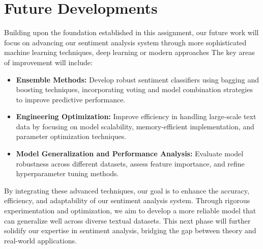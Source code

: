 \section{Future Developments}

Building upon the foundation established in this assignment, our future work will focus on advancing our sentiment analysis system through more sophisticated machine learning techniques, deep learning or modern approaches The key areas of improvement will include:

\begin{itemize}
    \item \textbf{Ensemble Methods:} Develop robust sentiment classifiers using bagging and boosting techniques, incorporating voting and model combination strategies to improve predictive performance.
    \item \textbf{Engineering Optimization:} Improve efficiency in handling large-scale text data by focusing on model scalability, memory-efficient implementation, and parameter optimization techniques.
    \item \textbf{Model Generalization and Performance Analysis:} Evaluate model robustness across different datasets, assess feature importance, and refine hyperparameter tuning methods.
\end{itemize}

By integrating these advanced techniques, our goal is to enhance the accuracy, efficiency, and adaptability of our sentiment analysis system. Through rigorous experimentation and optimization, we aim to develop a more reliable model that can generalize well across diverse textual datasets. This next phase will further solidify our expertise in sentiment analysis, bridging the gap between theory and real-world applications.

\newpage
